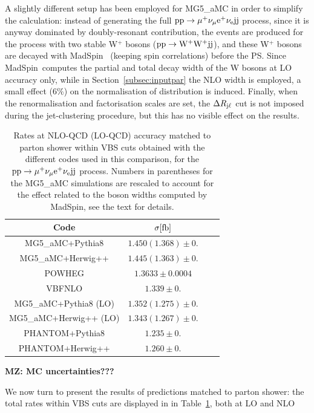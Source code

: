 A slightly different setup has been employed for {\sc MG5\_aMC} in order to simplify the calculation: instead of generating the full
${\rm p}{\rm p}\to\mu^+\nu_\mu{\rm e}^+\nu_{\rm e}{\rm j}{\rm j}$ process, since it is anyway dominated by doubly-resonant contribution, the
events are produced for the process with two stable W$^+$ bosons (${\rm p}{\rm p}\to{\rm W^+}{\rm W^+}{\rm j}{\rm j}$), and these W$^+$ bosons
are decayed with {\sc MadSpin}~\cite{Artoisenet:2012st} (keeping spin correlations) before the PS. Since {\sc MadSpin}\ computes
the partial and total decay width of the W bosons at LO accuracy only, while in Section~\ref{subsec:inputpar} the NLO width is employed,
a small effect (6\%) on the normalisation of distribution is induced. Finally, when the renormalisation
and factorisation scales are set, the $\Delta R_{\text{j}\ell}$ cut is not imposed during the jet-clustering procedure, but this has no visible effect
on the results.
%
\begin{table}[h!]
    \centering
    \begin{tabular}{c|c|c|c}
        Code  &  $\sigma[\rm{fb}]$  \\
        \hline
        {\sc MG5\_aMC}+{\sc Pythia8}&  $1.450 (1.368) \pm 0.$  \\
        {\sc MG5\_aMC}+{\sc Herwig++}&  $1.445 (1.363) \pm 0.$  \\
        {\sc POWHEG}  &  $1.3633 \pm 0.0004$  \\
        {\sc VBFNLO}  &  $1.339 \pm 0.$  \\
        \hline
        {\sc MG5\_aMC}+{\sc Pythia8} (LO)&  $1.352 (1.275) \pm 0.$  \\
        {\sc MG5\_aMC}+{\sc Herwig++} (LO)&  $1.343 (1.267)  \pm 0.$  \\
        {\sc PHANTOM}+{\sc Pythia8} &  $1.235  \pm 0.$  \\
        {\sc PHANTOM}+{\sc Herwig++} &  $1.260  \pm 0.$  \\
    \end{tabular}
    \caption{\label{tab:PSrates} Rates at NLO-QCD (LO-QCD) accuracy matched to parton shower within VBS cuts obtained with the different codes used in this comparison,
    for the ${\rm p}{\rm p}\to\mu^+\nu_\mu{\rm e}^+\nu_{\rm e}{\rm j}{\rm j}$ process. Numbers in parentheses for the {\sc MG5\_aMC} simulations
    are rescaled to account for the effect related to the boson widths computed by {\sc MadSpin}, see the text for details.}
{\bf MZ: MC uncertainties???}
\end{table}
%
We now turn to present the results of predictions matched to parton shower: the total rates within VBS cuts are displayed in in Table~\ref{tab:PSrates}, both at LO and NLO 
